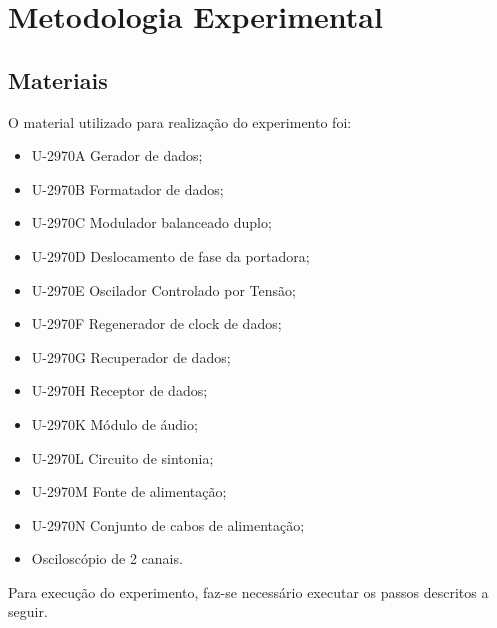 \newpage
\section{Metodologia Experimental}

    \subsection{Materiais}
        O material utilizado para realização do experimento foi:

        \begin{itemize}
            \item U-2970A Gerador de dados;
            \item U-2970B Formatador de dados;
            \item U-2970C Modulador balanceado duplo;
            \item U-2970D Deslocamento de fase da portadora;
            \item U-2970E Oscilador Controlado por Tensão;
            \item U-2970F Regenerador de clock de dados;
            \item U-2970G Recuperador de dados;
            \item U-2970H Receptor de dados;
            \item U-2970K Módulo de áudio;
            \item U-2970L Circuito de sintonia;
            \item U-2970M Fonte de alimentação;
            \item U-2970N Conjunto de cabos de alimentação;
            \item Osciloscópio de 2 canais.
        \end{itemize}

        Para execução do experimento, faz-se necessário executar os passos descritos a seguir.

    
